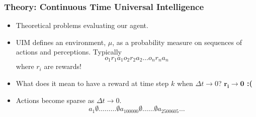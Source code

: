 \documentclass{beamer}
\begin{document}
       \begin{frame}
    \frametitle{Theory: Continuous Time Universal Intelligence}
    \begin{itemize}
      \item Theoretical problems evaluating our agent.
      \item UIM defines an environment, $\mu$, as a probability measure on sequences of actions and perceptions. Typically
      \begin{equation}
        o_1r_1a_1o_2r_2a_2\dots o_nr_na_n          
       \end{equation}   
       where $r_i$ are rewards!
       \item What does it mean to have a reward at time step $k$ when $\Delta t \to 0$? \textbf{$\pmb{r_i} \pmb{\to} \pmb{0}$ :(}
       \item Actions become sparse as $\Delta t \to 0.$
       \begin{equation}
         a_1\emptyset\dots\dots\dots\emptyset a_{100000} \emptyset \dots\dots \emptyset a_{2500605}\dots
        \end{equation} 
    \end{itemize}
    \end{frame}
\end{document}
